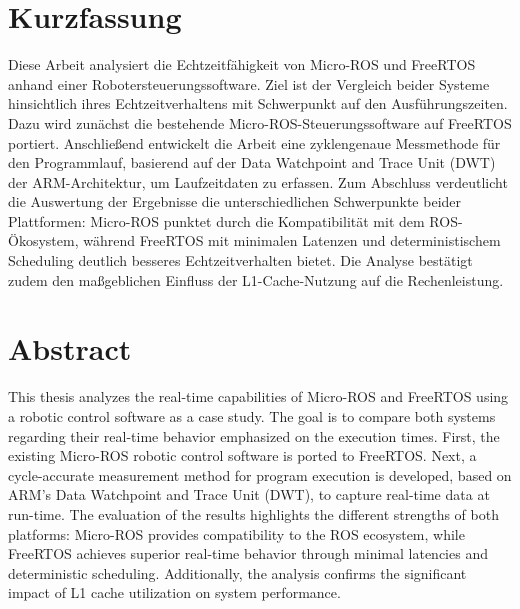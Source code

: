 \section*{Kurzfassung}

Diese Arbeit analysiert die Echtzeitfähigkeit von Micro-ROS und FreeRTOS anhand
einer Robotersteuerungssoftware. Ziel ist der Vergleich beider Systeme
hinsichtlich ihres Echtzeitverhaltens mit Schwerpunkt auf den Ausführungszeiten.
Dazu wird zunächst die bestehende Micro-ROS-Steuerungssoftware auf FreeRTOS
portiert. Anschließend entwickelt die Arbeit eine zyklengenaue Messmethode für
den Programmlauf, basierend auf der Data Watchpoint and Trace Unit (DWT) der
ARM-Architektur, um Laufzeitdaten zu erfassen. Zum Abschluss verdeutlicht die
Auswertung der Ergebnisse die unterschiedlichen Schwerpunkte beider Plattformen:
Micro-ROS punktet durch die Kompatibilität mit dem ROS-Ökosystem, während
FreeRTOS mit minimalen Latenzen und deterministischem Scheduling deutlich
besseres Echtzeitverhalten bietet. Die Analyse bestätigt zudem den maßgeblichen
Einfluss der L1-Cache-Nutzung auf die Rechenleistung.

\section*{Abstract}

This thesis analyzes the real-time capabilities of Micro-ROS and FreeRTOS using
a robotic control software as a case study. The goal is to compare both systems
regarding their real-time behavior emphasized on the execution times. First, the
existing Micro-ROS robotic control software is ported to FreeRTOS. Next, a
cycle-accurate measurement method for program execution is developed, based on
ARM's Data Watchpoint and Trace Unit (DWT), to capture real-time data at
run-time. The evaluation of the results highlights the different strengths of
both platforms: Micro-ROS provides compatibility to the ROS ecosystem, while
FreeRTOS achieves superior real-time behavior through minimal latencies and
deterministic scheduling. Additionally, the analysis confirms the significant
impact of L1 cache utilization on system performance.
